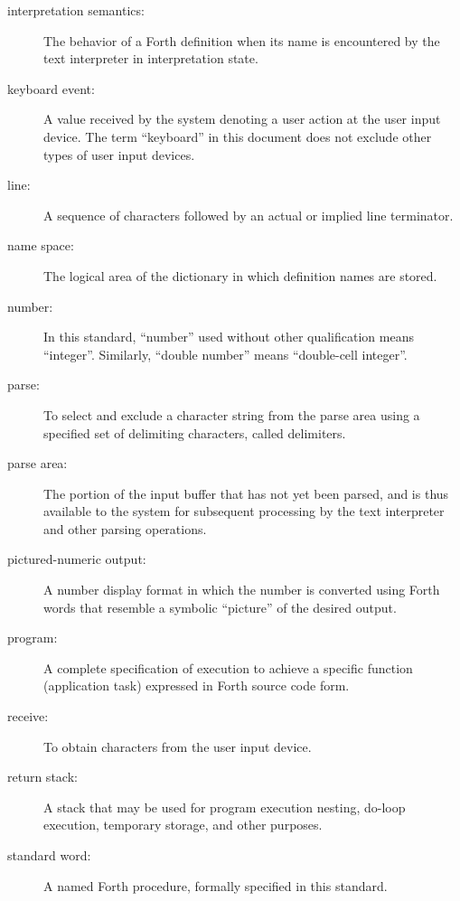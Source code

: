 \begin{description}
\item[interpretation semantics:]
	The behavior of a Forth definition when its name is encountered
	by the text interpreter in interpretation state.

\item[keyboard event:]
	A value received by the system denoting a user action at the user
	input device. The term ``keyboard'' in this document does not
	exclude other types of user input devices.

\item[line:]
	A sequence of characters followed by an actual or implied line
	terminator.

\item[name space:]
	The logical area of the dictionary in which definition names are
	stored.

\item[number:]
	In this standard, ``number'' used without other qualification means
	``integer''. Similarly, ``double number'' means ``double-cell
	integer''.

\item[parse:]
	To select and exclude a character string from the parse area using
	a specified set of delimiting characters, called delimiters.

\item[parse area:]
	The portion of the input buffer that has not yet been parsed, and
	is thus available to the system for subsequent processing by the
	text interpreter and other parsing operations.

\item[pictured-numeric output:]
	A number display format in which the number is converted using
	Forth words that resemble a symbolic ``picture'' of the desired
	output.

\item[program:]
	A complete specification of execution to achieve a specific
	function (application task) expressed in Forth source code form.

\item[receive:]
	To obtain characters from the user input device.

\item[return stack:]
	A stack that may be used for program execution nesting, do-loop
	execution, temporary storage, and other purposes.

\item[standard word:]
	A named Forth procedure, formally specified in this standard.


\end{description}
